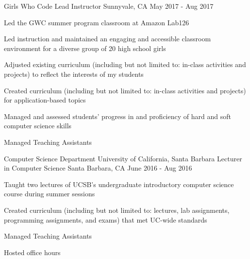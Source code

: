 \begin{cventries}
  \cventry
{Girls Who Code}
    {Lead Instructor}
    {Sunnyvale, CA}
    {May 2017 - Aug 2017}
    {
      \begin{cvitems}
	\item {Led the GWC summer program classroom at Amazon Lab126}\\
	\begin{cvitems}
        \item Led instruction and maintained an engaging and accessible classroom environment for a diverse group of 20 high school girls
         \item Adjusted existing curriculum (including but not limited to: in-class activities and projects) to reflect the interests of my students
         \item Created curriculum (including but not limited to: in-class activities and projects) for application-based topics
	\item Managed and assessed students’ progress in and proficiency of hard and soft computer science skills
	\item Managed Teaching Assistants
	\end{cvitems}
	\vspace{2mm}
      \end{cvitems}
    }

  \cventry
{Computer Science Department \newline University of California, Santa Barbara}
    {Lecturer in Computer Science}
    {Santa Barbara, CA}
    {June 2016 - Aug 2016}
    {
      \begin{cvitems}
	\item {Taught two lectures of UCSB's undergraduate introductory computer science course during summer sessions}\\
	\begin{cvitems}
         \item Created curriculum (including but not limited to: lectures, lab assignments, programming assignments, and exams) that met UC-wide standards
	\item Managed Teaching Assistants
	\item Hosted office hours 
	\end{cvitems}
	\vspace{2mm}
      \end{cvitems}
    }


\end{cventries}
